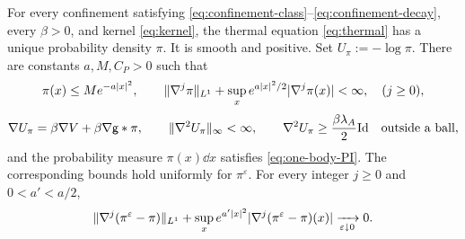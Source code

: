 \documentclass[11pt,reqno]{amsart}
\numberwithin{equation}{section}
\theoremstyle{plain}
\theoremstyle{remark}
\DeclarePairedDelimiter{\norm}{\lVert}{\rVert}
\newcommand{\Id}{\mathrm{Id}}
\begin{document}
\begin{lemma}\label{lem:thermal}
For every confinement satisfying \eqref{eq:confinement-class}--\eqref{eq:confinement-decay}, every $\beta>0$, and kernel \eqref{eq:kernel}, the thermal equation \eqref{eq:thermal} has a unique probability density $\pi$. It is smooth and positive. Set $U_\pi:=-\log\pi$. There are constants $a,M,C_P>0$ such that
\begin{equation}\label{eq:thermal-bounds}
 \pi(x)\le Me^{-a|x|^2},\qquad
 \norm{\nabla^j\pi}_{L^1}+\sup_x e^{a|x|^2/2}|\nabla^j\pi(x)|<\infty,\quad(j\ge0),
\end{equation}
\begin{equation}\label{eq:thermal-score}
 \nabla U_\pi=\beta\nabla V+\beta\nabla\g*\pi,
 \qquad \norm{\nabla^2U_\pi}_\infty<\infty,\qquad
 \nabla^2U_\pi\ge\frac{\beta\lambda_A}{2}\Id\quad\text{outside a ball},
\end{equation}
and the probability measure $\pi(x)\dd x$ satisfies \eqref{eq:one-body-PI}. The corresponding bounds hold uniformly for $\pi^\varepsilon$. For every integer $j\ge0$ and $0<a'<a/2$,
\begin{equation}\label{eq:thermal-cutoff-convergence}
 \norm{\nabla^j(\pi^\varepsilon-\pi)}_{L^1}
 +\sup_x e^{a'|x|^2}|\nabla^j(\pi^\varepsilon-\pi)(x)|\xrightarrow[\varepsilon\downarrow0]{}0.
\end{equation}
\end{lemma}
\end{document}

